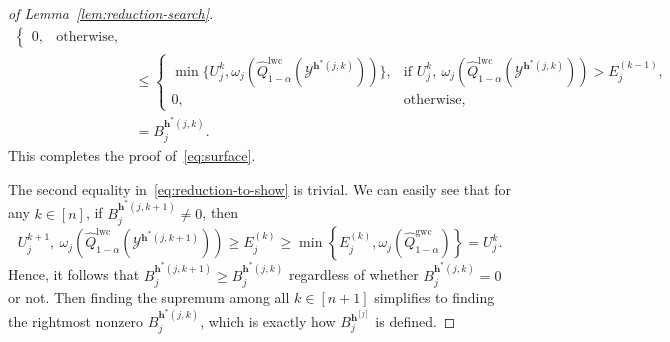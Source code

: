 \begin{proof}[of Lemma~\ref{lem:reduction-search}]
\begin{align*}
\begin{cases}
0, & \text{otherwise},
 \end{cases}\\
&\leq \begin{cases}
\min\!\bigl\{U^{k}_j, \omega_j(\hat{Q}^{\mathrm{lwc}}_{1-\alpha}(\mathcal{Y}^{\mathbf{h}^*(j,k)}))\bigr\},
& \text{if } U^{k}_j,\ \omega_j(\hat{Q}^{\mathrm{lwc}}_{1-\alpha}(\mathcal{Y}^{\mathbf{h}^*(j,k)})) > E^{(k-1)}_j,\\[0.4em]
0, & \text{otherwise},
\end{cases}\\
&=B^{\mathbf{h}^*(j,k)}_j.
\end{align*}
This completes the proof of~\eqref{eq:surface}. 

The second equality in~\eqref{eq:reduction-to-show}
is trivial. We can easily see that for any $k \in [n]$, if $B^{\mathbf{h}^*(j,k+1)}_j \neq 0$, then
\[
U^{k+1}_j,\ \omega_j(\hat{Q}^{\mathrm{lwc}}_{1-\alpha}(\mathcal{Y}^{\mathbf{h}^*(j,k+1)})) \geq E^{(k)}_j \geq \min\left\{E^{(k)}_j, \omega_j(\hat{Q}^{\mathrm{gwc}}_{1-\alpha})\right\} = U^k_j.
\]
Hence, it follows that $B^{\mathbf{h}^*(j,k+1)}_j \geq B^{\mathbf{h}^*(j,k)}_j$ regardless of whether $B^{\mathbf{h}^*(j,k)}_j = 0$ or not. Then finding the supremum among all $k\in [n+1]$ simplifies to finding the rightmost nonzero $B_j^{\mathbf{h}^*(j,k)}$, which is exactly how $B^{\mathbf{h}^{[j]}}_j$ is defined.


\end{proof}
